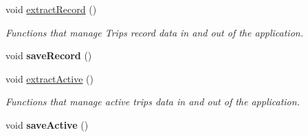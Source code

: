 \begin{Indent}
\begin{DoxyCompactItemize}
void \hyperlink{group___agency_ga8cafe0f0410e881f1a0d7a1bdd502058}{extract\+Record} ()
\begin{DoxyCompactList}\small\item\em Functions that manage Trips record data in and out of the application. \end{DoxyCompactList}\item 
void {\bfseries save\+Record} ()
\item 
void \hyperlink{group___agency_ga82ad0980163a0e874b1ca165b7b9c91c}{extract\+Active} ()
\begin{DoxyCompactList}\small\item\em Functions that manage active trips data in and out of the application. \end{DoxyCompactList}\item 
void {\bfseries save\+Active} ()
\end{DoxyCompactItemize}
\end{Indent}
